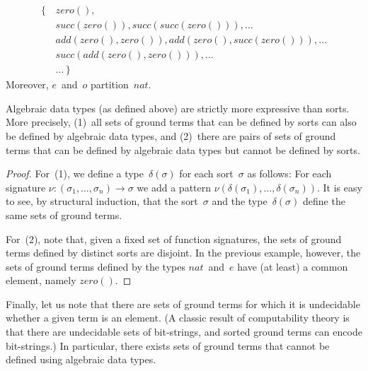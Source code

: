 \documentclass[a4paper,12pt,oneside,fleqn]{book} %
\newcommand{\rg}[1]{\marginpar{\tiny\raggedright\textcolor{blue}{\bf rg:} #1}}
\renewcommand{\rg}{}
\begin{document}
{\begin{equation}
\begin{aligned}
\{\,&\mathit{zero}(), \\
    &\mathit{succ}(\mathit{zero}()),
        \mathit{succ}(\mathit{succ}(\mathit{zero}())), \ldots \\
    &\mathit{add}(\mathit{zero}(), \mathit{zero}()),
        \mathit{add}(\mathit{zero}(), \mathit{succ}(\mathit{zero}())),
        \ldots \\
    &\mathit{succ}(\mathit{add}(\mathit{zero}(), \mathit{zero}())),
        \ldots \\
    &\ldots\, \}
\end{aligned}
\end{equation}
Moreover, $e$~and~$o$ partition~$\mathit{nat}$.

\begin{proposition}
Algebraic data types (as defined above) are strictly more expressive than
sorts. More precisely, (1)~all sets of ground terms that can be defined by
sorts can also be defined by algebraic data types, and (2)~there are pairs
of sets of ground terms that can be defined by algebraic data types but
cannot be defined by sorts.
\end{proposition}

\begin{proof}
For~(1), we define a type~$\delta(\sigma)$ for each sort~$\sigma$ as
follows: For each signature $\nu:(\sigma_1,\ldots,\sigma_n)\to\sigma$ we
add a pattern $\nu(\delta(\sigma_1),\ldots,\delta(\sigma_n))$. It is easy
to see, by structural induction, that the sort~$\sigma$ and the
type~$\delta(\sigma)$ define the same sets of ground terms.

For~(2), note that, given a fixed set of function signatures, the sets of
ground terms defined by distinct sorts are disjoint. In the previous
example, however, the sets of ground terms defined by the types
$\mathit{nat}$~and~$e$ have (at least) a common element, namely
$\mathit{zero}()$.
\end{proof}

Finally, let us note that there are sets of ground terms for which it is
undecidable whether a given term is an element.  (A classic result of
computability theory is that there are undecidable sets of bit-strings, and
sorted ground terms can encode bit-strings.) In particular, there exists
sets of ground terms that cannot be defined using algebraic data types.


}
\end{document}
